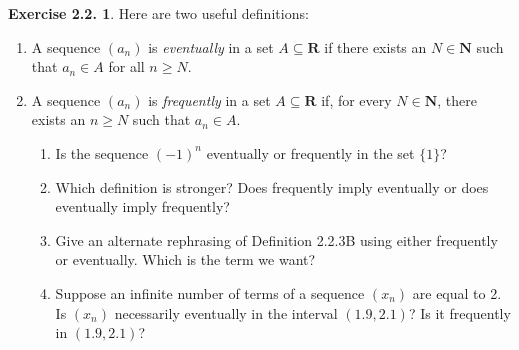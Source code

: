 \documentclass[12pt]{article}
\theoremstyle{definition}
\theoremstyle{exercise}
\newtheorem{exercise}{Exercise 2.2.}
\theoremstyle{solution}
\newcommand{\N}{\mathbf{N}}
\newcommand{\R}{\mathbf{R}}
\begin{document}
\begin{exercise}
\label{ex:7}
    Here are two useful definitions:
    \begin{enumerate}[label = (\roman*)]
        \item A sequence \( (a_n) \) is \textit{eventually} in a set \( A \subseteq \R \) if there exists an \( N \in \N \) such that \( a_n \in A \) for all \( n \geq N \).

        \item A sequence \( (a_n) \) is \textit{frequently} in a set \( A \subseteq \R \) if, for every \( N \in \N \), there exists an \( n \geq N \) such that \( a_n \in A \).
        \begin{enumerate}
            \item Is the sequence \( (-1)^n \) eventually or frequently in the set \( \{ 1 \} \)?

            \item Which definition is stronger? Does frequently imply eventually or does eventually imply frequently?

            \item Give an alternate rephrasing of Definition 2.2.3B using either frequently or eventually. Which is the term we want?

            \item Suppose an infinite number of terms of a sequence \( (x_n) \) are equal to 2. Is \( (x_n) \) necessarily eventually in the interval \( (1.9, 2.1) \)? Is it frequently in \( (1.9, 2.1) \)?
        \end{enumerate}
    \end{enumerate}
\end{exercise}
\end{document}
